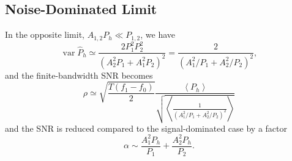 \documentclass[modern]{aastex63}
\DeclareMathOperator{\var}{var}
\begin{document}
\subsection{Noise-Dominated Limit}

In the opposite limit, $A_{1,2} P_h \ll P_{1,2}$, we have
%
\begin{equation}
  \var \hat{P}_h \simeq \frac{2 P_1^2 P_2^2}{\left( A_2^2 P_1 + A_1^2 P_2\right)^2} = \frac{2}{\left( A_1^2 / P_1 + A_2^2/P_2 \right)^2},
\end{equation}
%
and the finite-bandwidth \ac{SNR} becomes
%
\begin{equation}
  \rho \simeq \sqrt{\frac{T\left(f_1 - f_0 \right)}{2}} \frac{\left\langle P_h \right\rangle}{ \sqrt{\left\langle \frac{1}{\left( A_1^2 / P_1 + A_2^2/P_2 \right)^2}\right\rangle}}
\end{equation}
%
and the \ac{SNR} is reduced compared to the signal-dominated case by a factor
%
\begin{equation}
  \label{eq:approx-snr-reduction}
  \alpha \sim \frac{A_1^2 P_h}{P_1} + \frac{A_2^2 P_h}{P_2}.
\end{equation}
%


\end{document}
